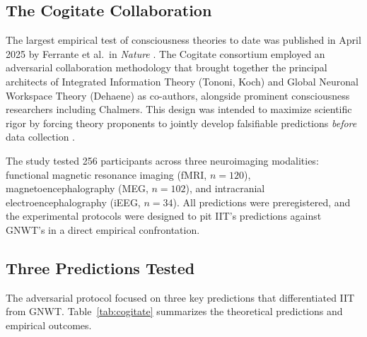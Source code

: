 
\subsection{The Cogitate Collaboration}

The largest empirical test of consciousness theories to date was published in April 2025 by
Ferrante et al.\ in \emph{Nature} \cite{ferrante2025adversarial}. The Cogitate consortium
employed an adversarial collaboration methodology that brought together the principal
architects of Integrated Information Theory (Tononi, Koch) and Global Neuronal Workspace
Theory (Dehaene) as co-authors, alongside prominent consciousness researchers including
Chalmers. This design was intended to maximize scientific rigor by forcing theory proponents
to jointly develop falsifiable predictions \emph{before} data collection
\cite{melloni2023adversarial}.

The study tested 256 participants across three neuroimaging modalities: functional magnetic
resonance imaging (fMRI, $n=120$), magnetoencephalography (MEG, $n=102$), and intracranial
electroencephalography (iEEG, $n=34$). All predictions were preregistered, and the
experimental protocols were designed to pit IIT's predictions against GNWT's in a direct
empirical confrontation.

\subsection{Three Predictions Tested}

The adversarial protocol focused on three key predictions that differentiated IIT from GNWT.
Table~\ref{tab:cogitate} summarizes the theoretical predictions and empirical outcomes.


